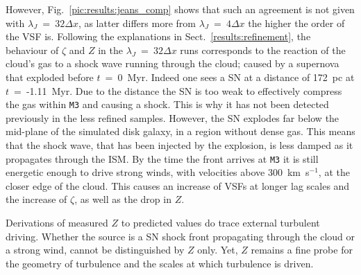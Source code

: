 However, Fig.~\ref{pic:results:jeans_comp} shows that such an agreement is not given with $\lambda_J$~=~$32\Delta{}x$, as latter differs more from $\lambda_J$~=~$4\Delta{}x$ the higher the order of the VSF is.
Following the explanations in Sect.~\ref{results:refinement}, the behaviour of $\zeta$ and $Z$ in the $\lambda_J$~=~$32\Delta{}x$ runs corresponds to the reaction of the cloud's gas to a shock wave running through the cloud; caused by a supernova that exploded before $t$~=~0~Myr. 
Indeed one sees a SN at a distance of 172~pc at $t$~=~-1.11~Myr. 
Due to the distance the SN is too weak to effectively compress the gas within \texttt{M3} and causing a shock.
This is why it has not been detected previously in the less refined samples.
However, the SN explodes far below the mid-plane of the simulated disk galaxy, in a region without dense gas.
This means that the shock wave, that has been injected by the explosion, is less damped as it propagates through the ISM. 
By the time the front arrives at \texttt{M3} it is still energetic enough to drive strong winds, with velocities above 300~km~s$^{-1}$, at the closer edge of the cloud. 
This causes an increase of VSFs at longer lag scales and the increase of $\zeta$, as well as the drop in $Z$.

Derivations of measured $Z$ to predicted values do trace external turbulent driving.
Whether the source is a SN shock front propagating through the cloud or a strong wind, cannot be distinguished by $Z$ only. 
Yet, $Z$ remains a fine probe for the geometry of turbulence and the scales at which turbulence is driven.

